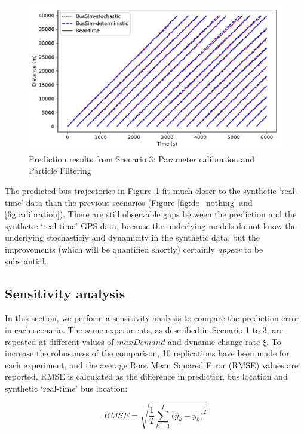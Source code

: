 \begin{figure}[htb]
    \centering
    \includegraphics[width=1\textwidth]{Figures/Fig_PF_IncreaseRate_5.pdf}
    \caption{Prediction results from Scenario 3: Parameter calibration and Particle Filtering}
    \label{fig:calibration_plus_PF}
\end{figure}

The predicted bus trajectories in Figure~\ref{fig:calibration_plus_PF} fit much closer to the synthetic `real-time' data than the previous scenarios (Figure \ref{fig:do_nothing} and \ref{fig:calibration}). There are still observable gaps between the prediction and the synthetic `real-time' GPS data, because the underlying models do not know the underlying stochasticiy and dynamicity in the synthetic data, but the improvements (which will be quantified shortly) certainly \textit{appear} to be substantial.


\subsection{Sensitivity analysis}

In this section, we perform a sensitivity analysis to compare the prediction error in each scenario. The same experiments, as described in Scenario 1 to 3, are repeated at different values of $maxDemand$ and dynamic change rate $\xi$. To increase the robustness of the comparison, 10 replications have been made for each experiment, and the average Root Mean Squared Error (RMSE) values are reported. RMSE is calculated as the difference in prediction bus location and synthetic `real-time' bus location: 

\begin{equation}
RMSE = \sqrt{\frac{1}{T}\sum_{k=1}^{T}{\Big(\hat{y}_k -y_k\Big)^2}}
\end{equation}

